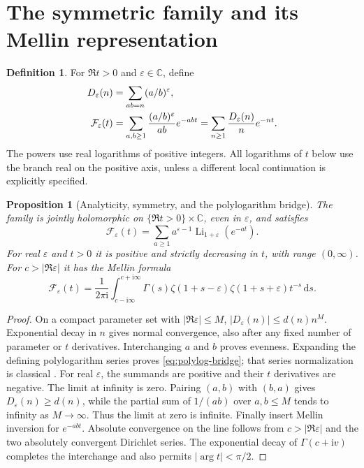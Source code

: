 \documentclass[11pt,a4paper]{article}
\numberwithin{equation}{section}
\newtheorem{proposition}[theorem]{Proposition}
\theoremstyle{definition}\newtheorem{definition}[theorem]{Definition}
\theoremstyle{remark}\newtheorem{remark}[theorem]{Remark}
\newcommand{\Li}{\operatorname{Li}}
\newcommand{\dd}{\,\mathrm d}
\newcommand{\eps}{\varepsilon}
\newcommand{\ii}{\mathrm i}
\newcommand{\C}{\mathbb C}\newcommand{\R}{\mathbb R}
\newcommand{\F}{\mathcal F}\newcommand{\CC}{\mathcal C}
\begin{document}
\section{The symmetric family and its Mellin representation}
\label{sec:mellin}

\begin{definition}
For $\Re t>0$ and $\eps\in\C$, define
\begin{align}
 D_\eps(n)&=\sum_{ab=n}(a/b)^\eps,\label{eq:divisor-weight}\\
 \F_\eps(t)&=\sum_{a,b\ge1}{(a/b)^\eps\over ab}e^{-abt}
 =\sum_{n\ge1}{D_\eps(n)\over n}e^{-nt}.
 \label{eq:family}
\end{align}
The powers use real logarithms of positive integers. All logarithms of
$t$ below use the branch real on the positive axis, unless a different
local continuation is explicitly specified.
\end{definition}

\begin{proposition}[Analyticity, symmetry, and the polylogarithm bridge]
\label{prop:family}
The family is jointly holomorphic on $\{\Re t>0\}\times\C$, even in
$\eps$, and satisfies
\begin{equation}\label{eq:polylog-bridge}
 \F_\eps(t)=\sum_{a\ge1}a^{\eps-1}\Li_{1+\eps}(e^{-at}).
\end{equation}
For real $\eps$ and $t>0$ it is positive and strictly decreasing in $t$,
with range $(0,\infty)$. For $c>|\Re\eps|$ it has the Mellin formula
\begin{equation}\label{eq:mellin}
 \F_\eps(t)=\frac1{2\pi\ii}\int_{c-\ii\infty}^{c+\ii\infty}
 \Gamma(s)\zeta(1+s-\eps)\zeta(1+s+\eps)t^{-s}\dd s.
\end{equation}
\end{proposition}
\begin{proof}
On a compact parameter set with $|\Re\eps|\le M$,
$|D_\eps(n)|\le d(n)n^M$. Exponential decay in $n$ gives normal
convergence, also after any fixed number of parameter or $t$ derivatives.
Interchanging $a$ and $b$ proves evenness. Expanding the defining
polylogarithm series proves \eqref{eq:polylog-bridge}; that series
normalization is classical \cite{DLMFpolylog}.
For real $\eps$, the summands are positive and their $t$ derivatives are
negative. The limit at infinity is zero. Pairing $(a,b)$ with $(b,a)$
gives $D_\eps(n)\ge d(n)$, while the partial sum of $1/(ab)$ over
$a,b\le M$ tends to infinity as $M\to\infty$. Thus the limit at zero is
infinite. Finally insert Mellin inversion for $e^{-abt}$. Absolute
convergence on the line follows from $c>|\Re\eps|$ and the two
absolutely convergent Dirichlet series. The exponential decay of
$\Gamma(c+\ii v)$ completes the interchange and also permits
$|\arg t|<\pi/2$.
\end{proof}
\end{document}
